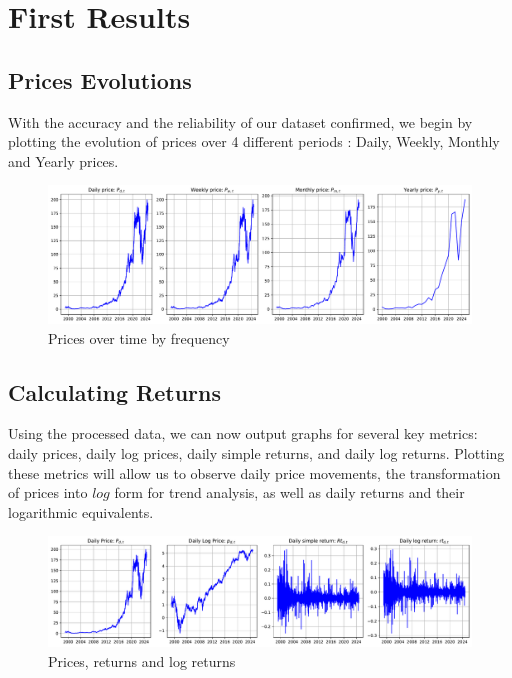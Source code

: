 \documentclass{article}
\begin{document}
\section{First Results}

\subsection{Prices Evolutions}

With the accuracy and the reliability of our dataset confirmed, we begin by plotting the evolution of prices over 4 different periods : Daily, Weekly, Monthly and Yearly prices.

\begin{figure}[H]
    \centering
    \includegraphics[width=\textwidth]{Img/prices_time.pdf}
    \caption{Prices over time by frequency}
    \label{fig:prices_time}
\end{figure}

\subsection{Calculating Returns}
Using the processed data, we can now output graphs for several key metrics: 
daily prices, daily log prices, daily simple returns, and daily log returns. 
Plotting these metrics will allow us to observe daily price movements, 
the transformation of prices into $log$ form for trend analysis, 
as well as daily returns and their logarithmic equivalents.
\begin{figure}[H]
    \centering
    \includegraphics[width=\textwidth]{Img/log_returns.pdf}
    \caption{Prices, returns and log returns}
    \label{fig:log_returns}
\end{figure}
\end{document}
